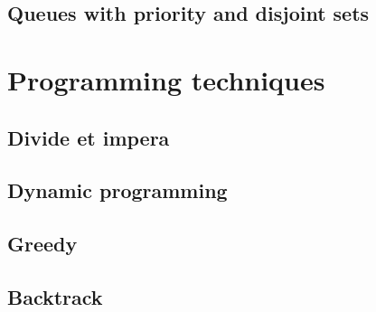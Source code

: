 \documentclass[10pt,a4paper]{book}
\begin{document}
\section{Queues with priority and disjoint sets}
\chapter{Programming techniques}
\section{Divide et impera}
\section{Dynamic programming}
\section{Greedy}
\section{Backtrack}
\end{document}
